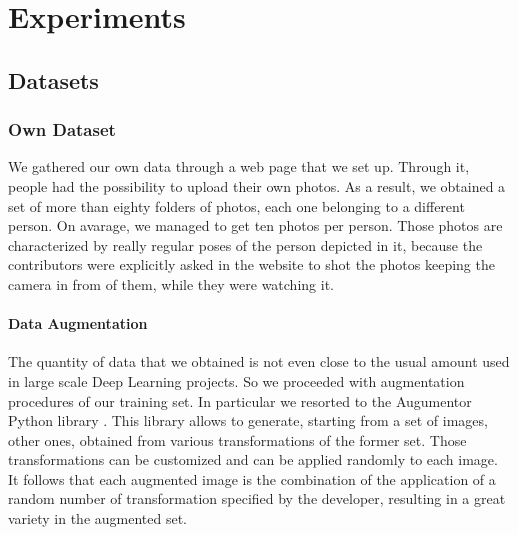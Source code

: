 \section{Experiments}

\subsection{Datasets}
\subsubsection{Own Dataset}
We gathered our own data through a web page \cite{gdpdataret} that we set up. Through it, people had the possibility to upload their own photos. As a result, we obtained a set of more than eighty folders of photos, each one belonging to a different person. On avarage, we managed to get ten photos per person. Those photos are characterized by really regular poses of the person depicted in it, because the contributors were explicitly asked in the website to shot the photos keeping the camera in from of them, while they were watching it.
\paragraph{Data Augmentation}
The quantity of data that we obtained is not even close to the usual amount used in large scale Deep Learning projects. So we proceeded with augmentation procedures of our training set. In particular we resorted to the Augumentor Python library \cite{augmentor}. This library allows to generate, starting from a set of images, other ones, obtained from various transformations of the former set. Those transformations can be customized and can be applied randomly to each image. It follows that each augmented image is the combination of the application of a random number of transformation specified by the developer, resulting in a great variety in the augmented set.


